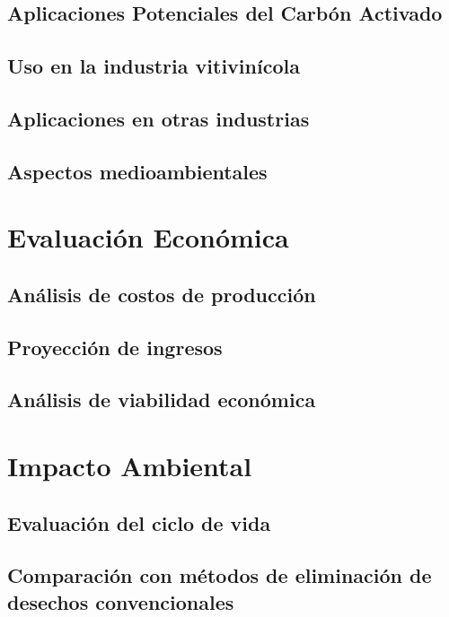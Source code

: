 \documentclass[12pt,a4paper,oneside]{book}
\begin{document}
\section{Aplicaciones Potenciales del Carbón Activado}

\section{Uso en la industria vitivinícola}

\section{Aplicaciones en otras industrias}

\section{Aspectos medioambientales}

\chapter{Evaluación Económica}

\section{Análisis de costos de producción}

\section{Proyección de ingresos}

\section{Análisis de viabilidad económica}


\chapter{Impacto Ambiental}

\section{Evaluación del ciclo de vida}

\section{Comparación con métodos de eliminación de desechos convencionales}
\end{document}
